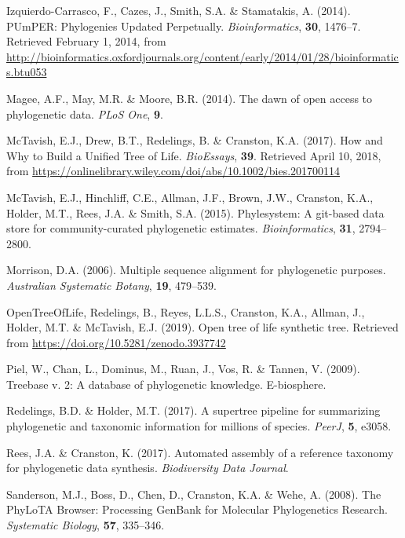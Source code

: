 \documentclass[]{article}
\begin{document}
\leavevmode\hypertarget{ref-izquierdo-carrasco_pumper:_2014}{}%
Izquierdo-Carrasco, F., Cazes, J., Smith, S.A. \& Stamatakis, A. (2014). PUmPER: Phylogenies Updated Perpetually. \emph{Bioinformatics}, \textbf{30}, 1476--7. Retrieved February 1, 2014, from \url{http://bioinformatics.oxfordjournals.org/content/early/2014/01/28/bioinformatics.btu053}

\leavevmode\hypertarget{ref-magee2014dawn}{}%
Magee, A.F., May, M.R. \& Moore, B.R. (2014). The dawn of open access to phylogenetic data. \emph{PLoS One}, \textbf{9}.

\leavevmode\hypertarget{ref-mctavish2018bioessay}{}%
McTavish, E.J., Drew, B.T., Redelings, B. \& Cranston, K.A. (2017). How and Why to Build a Unified Tree of Life. \emph{BioEssays}, \textbf{39}. Retrieved April 10, 2018, from \url{https://onlinelibrary.wiley.com/doi/abs/10.1002/bies.201700114}

\leavevmode\hypertarget{ref-mctavish2015phylesystem}{}%
McTavish, E.J., Hinchliff, C.E., Allman, J.F., Brown, J.W., Cranston, K.A., Holder, M.T., Rees, J.A. \& Smith, S.A. (2015). Phylesystem: A git-based data store for community-curated phylogenetic estimates. \emph{Bioinformatics}, \textbf{31}, 2794--2800.

\leavevmode\hypertarget{ref-morrison2006multiple}{}%
Morrison, D.A. (2006). Multiple sequence alignment for phylogenetic purposes. \emph{Australian Systematic Botany}, \textbf{19}, 479--539.

\leavevmode\hypertarget{ref-opentreeoflife2019synth}{}%
OpenTreeOfLife, Redelings, B., Reyes, L.L.S., Cranston, K.A., Allman, J., Holder, M.T. \& McTavish, E.J. (2019). Open tree of life synthetic tree. Retrieved from \url{https://doi.org/10.5281/zenodo.3937742}

\leavevmode\hypertarget{ref-piel2009treebase}{}%
Piel, W., Chan, L., Dominus, M., Ruan, J., Vos, R. \& Tannen, V. (2009). Treebase v. 2: A database of phylogenetic knowledge. E-biosphere.

\leavevmode\hypertarget{ref-redelings2017supertree}{}%
Redelings, B.D. \& Holder, M.T. (2017). A supertree pipeline for summarizing phylogenetic and taxonomic information for millions of species. \emph{PeerJ}, \textbf{5}, e3058.

\leavevmode\hypertarget{ref-rees2017automated}{}%
Rees, J.A. \& Cranston, K. (2017). Automated assembly of a reference taxonomy for phylogenetic data synthesis. \emph{Biodiversity Data Journal}.

\leavevmode\hypertarget{ref-sanderson2008phylota}{}%
Sanderson, M.J., Boss, D., Chen, D., Cranston, K.A. \& Wehe, A. (2008). The PhyLoTA Browser: Processing GenBank for Molecular Phylogenetics Research. \emph{Systematic Biology}, \textbf{57}, 335--346.
\end{document}
